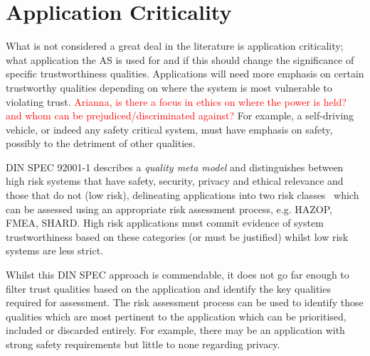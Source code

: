 \section{Application Criticality}\label{application_criticality}

What is not considered a great deal in the literature is application criticality; what application the AS is used for and if this should change the significance of specific trustworthiness qualities. Applications will need more emphasis on certain trustworthy qualities depending on where the system is most vulnerable to violating trust. 
%
\textcolor{red}{Arianna, is there a focus in ethics on where the power is held? and whom can be prejudiced/discriminated against?} 
%
For example, a self-driving vehicle, or indeed any safety critical system, must have emphasis on safety, possibly to the detriment of other qualities.

DIN SPEC 92001-1 describes a \emph{quality meta model} and distinguishes between high risk systems that have safety, security, privacy and ethical relevance and those that do not (low risk), delineating applications into two risk classes~\cite{Englisch2019} which can be assessed using an appropriate risk assessment process, e.g. HAZOP, FMEA, SHARD. High risk applications must commit evidence of system trustworthiness based on these categories (or must be justified) whilst low risk systems are less strict.

Whilst this DIN SPEC approach is commendable, it does not go far enough to filter trust qualities based on the application and identify the key qualities required for assessment. The risk assessment process can be used to identify those qualities which are most pertinent to the application which can be prioritised, included or discarded entirely. For example, there may be an application with strong safety requirements but little to none regarding privacy. 









